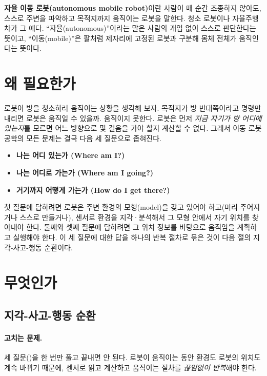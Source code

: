 \textbf{자율 이동 로봇(autonomous mobile robot)}이란 사람이 매 순간 조종하지
않아도, 스스로 주변을 파악하고 목적지까지 움직이는 로봇을 말한다. 청소
로봇이나 자율주행차가 그 예다. ``자율(autonomous)''이라는 말은 사람의 개입 없이
스스로 판단한다는 뜻이고, ``이동(mobile)''은 팔처럼 제자리에 고정된 로봇과
구분해 몸체 전체가 움직인다는 뜻이다.

\section{왜 필요한가}
\label{sec:lec01-why}

로봇이 방을 청소하러 움직이는 상황을 생각해 보자. 목적지가 방 반대쪽이라고
명령만 내리면 로봇은 움직일 수 있을까. 움직이지 못한다. 로봇은 먼저 \emph{지금
자기가 방 어디에 있는지}를 모르면 어느 방향으로 몇 걸음을 가야 할지 계산할 수
없다. 그래서 이동 로봇공학의 모든 문제는 결국 다음 세 질문으로 좁혀진다.

\begin{itemize}
  \item \textbf{나는 어디 있는가 (Where am I?)}
  \item \textbf{나는 어디로 가는가 (Where am I going?)}
  \item \textbf{거기까지 어떻게 가는가 (How do I get there?)}
\end{itemize}

첫 질문에 답하려면 로봇은 주변 환경의 모형(model)을 갖고 있어야 하고(미리
주어지거나 스스로 만들거나), 센서로 환경을 지각·분석해서 그 모형 안에서 자기
위치를 찾아내야 한다. 둘째와 셋째 질문에 답하려면 그 위치 정보를 바탕으로
움직임을 계획하고 실행해야 한다. %
이 세 질문에 대한 답을 하나의 반복 절차로 묶은 것이 다음 절의 지각-사고-행동
순환이다.

\section{무엇인가}
\label{sec:lec01-what}

\subsection{지각-사고-행동 순환}
\label{sec:lec01-stc}

\paragraph{고치는 문제.} 세 질문()을 한 번만 풀고 끝내면
안 된다. 로봇이 움직이는 동안 환경도 로봇의 위치도 계속 바뀌기 때문에, 센서로
읽고 계산하고 움직이는 절차를 \emph{끊임없이 반복}해야 한다.

